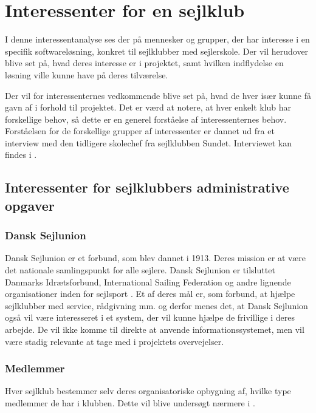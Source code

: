 \chapter{Interessenter for en sejlklub}\label{chap:interessent-analyse-ved-sejlklubber}

I denne interessentanalyse ses der på mennesker og grupper, der har interesse i en specifik softwareløsning,
konkret til sejlklubber med sejlerskole. Der vil herudover blive set på, hvad deres interesse er i projektet,
samt hvilken indflydelse en løsning ville kunne have på deres tilværelse.

Der vil for interessenternes vedkommende blive set på, hvad de hver især kunne få gavn af i forhold til
projektet. Det er værd at notere, at hver enkelt klub har forskellige behov, så dette er en generel forståelse
af interessenternes behov. Forståelsen for de forskellige grupper af interessenter er dannet ud fra et
interview med den tidligere skolechef fra sejlklubben Sundet. Interviewet kan findes i
.


\section{Interessenter for sejlklubbers administrative opgaver}


\subsection{Dansk Sejlunion}

Dansk Sejlunion er et forbund, som blev dannet i 1913. Deres mission er at være det nationale samlingspunkt for alle
sejlere. Dansk Sejlunion er tilsluttet Danmarks Idrætsforbund, International Sailing Federation og andre lignende
organisationer inden for sejlsport \citep{Sejlsportdk}.
Et af deres mål er, som forbund, at hjælpe sejlklubber med service, rådgivning mm. og derfor menes det, at Dansk
Sejlunion også vil være interesseret i et system, der vil kunne hjælpe de frivillige i deres arbejde. 
De vil ikke komme til direkte at anvende informationssystemet, men vil være stadig relevante at tage med i projektets overvejelser.


\subsection{Medlemmer}

Hver sejlklub bestemmer selv deres organisatoriske opbygning af, hvilke type medlemmer de har i klubben.
Dette vil blive undersøgt nærmere i . 


